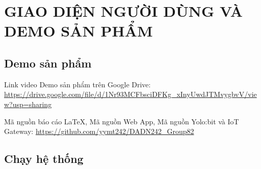 \newpage
\section{GIAO DIỆN NGƯỜI DÙNG VÀ DEMO SẢN PHẨM}

\subsection{Demo sản phẩm}

Link video Demo sản phẩm trên Google Drive: \url{https://drive.google.com/file/d/1Nr93MCFbsciDFKg_xInyUwdJTMvygbvV/view?usp=sharing}

Mã nguồn báo cáo \LaTeX, Mã nguồn Web App, Mã nguồn Yolo:bit và IoT Gateway: \url{https://github.com/yymt242/DADN242_Group82}

\subsection{Chạy hệ thống}

